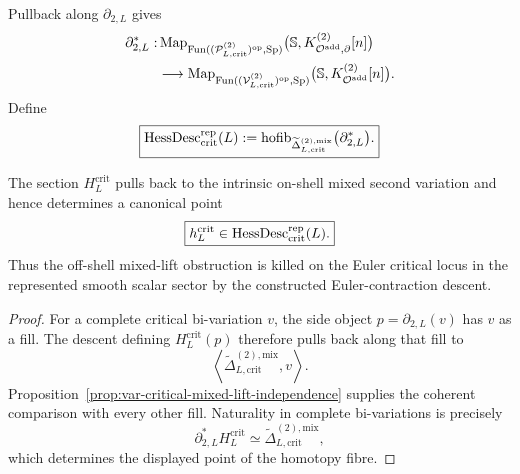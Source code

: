 \begin{definition}
\label{def:var-critical-hessian-descent}
Pullback along \(\partial_{2,L}\) gives
\[
\begin{aligned}
    \partial_{2,L}^*:
    &\operatorname{Map}_{\operatorname{Fun}((\mathcal P^{(2)}_{L,\mathrm{crit}})^{\mathrm{op}},\operatorname{Sp})}
    \bigl(\mathbb S,K^{(2)}_{\mathcal O^{\mathrm{add}},\partial}[n]\bigr)
    \\
    &\longrightarrow
    \operatorname{Map}_{\operatorname{Fun}((\mathcal V^{(2)}_{L,\mathrm{crit}})^{\mathrm{op}},\operatorname{Sp})}
    \bigl(\mathbb S,K^{(2)}_{\mathcal O^{\mathrm{add}}}[n]\bigr).
\end{aligned}
\]
Define
\[
    \boxed{
    \operatorname{HessDesc}^{\mathrm{rep}}_{\mathrm{crit}}(L)
    :=
    \operatorname{hofib}_{\widetilde\Delta_{L,\mathrm{crit}}^{(2),\mathrm{mix}}}
    \bigl(\partial_{2,L}^*\bigr).
    }
\]
\end{definition}

\begin{theorem}
\label{thm:var-critical-hessian-descent}
The section \(H_L^{\mathrm{crit}}\) pulls back to the intrinsic on-shell mixed second variation and hence determines a canonical point
\[
    \boxed{
    h_L^{\mathrm{crit}}
    \in
    \operatorname{HessDesc}^{\mathrm{rep}}_{\mathrm{crit}}(L).
    }
\]
Thus the off-shell mixed-lift obstruction is killed on the Euler critical locus in the represented smooth scalar sector by the constructed Euler-contraction descent.
\end{theorem}

\begin{proof}
For a complete critical bi-variation \(v\), the side object \(p=\partial_{2,L}(v)\) has \(v\) as a fill.  The descent defining \(H_L^{\mathrm{crit}}(p)\) therefore pulls back along that fill to
\[
    \left\langle
      \widetilde\Delta_{L,\mathrm{crit}}^{(2),\mathrm{mix}},v
    \right\rangle.
\]
Proposition~\ref{prop:var-critical-mixed-lift-independence} supplies the coherent comparison with every other fill.  Naturality in complete bi-variations is precisely
\[
    \partial_{2,L}^*H_L^{\mathrm{crit}}
    \simeq
    \widetilde\Delta_{L,\mathrm{crit}}^{(2),\mathrm{mix}},
\]
which determines the displayed point of the homotopy fibre.
\end{proof}


